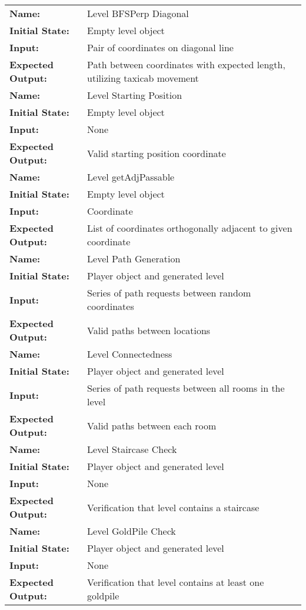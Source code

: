 \documentclass[12pt, titlepage]{article}
\begin{document}
\begin{center}
\begin{longtable}{ l | l }
\hline
\textbf{Name:} & Level BFSPerp Diagonal\\
\textbf{Initial State:} & Empty level object\\
\textbf{Input:} & Pair of coordinates on diagonal line\\
\textbf{Expected Output:} & Path between coordinates with expected length, utilizing taxicab movement\\
\hline
\textbf{Name:} & Level Starting Position\\
\textbf{Initial State:} & Empty level object\\
\textbf{Input:} & None\\
\textbf{Expected Output:} & Valid starting position coordinate\\
\hline
\textbf{Name:} & Level getAdjPassable\\
\textbf{Initial State:} & Empty level object\\
\textbf{Input:} & Coordinate\\
\textbf{Expected Output:} & List of coordinates orthogonally adjacent to given coordinate\\
\hline
\textbf{Name:} & Level Path Generation\\
\textbf{Initial State:} & Player object and generated level\\
\textbf{Input:} & Series of path requests between random coordinates\\
\textbf{Expected Output:} & Valid paths between locations\\
\hline
\textbf{Name:} & Level Connectedness\\
\textbf{Initial State:} & Player object and generated level\\
\textbf{Input:} & Series of path requests between all rooms in the level\\
\textbf{Expected Output:} & Valid paths between each room\\
\hline
\textbf{Name:} & Level Staircase Check\\
\textbf{Initial State:} & Player object and generated level\\
\textbf{Input:} & None\\
\textbf{Expected Output:} & Verification that level contains a staircase\\
\hline
\textbf{Name:} & Level GoldPile Check\\
\textbf{Initial State:} & Player object and generated level\\
\textbf{Input:} & None\\
\textbf{Expected Output:} & Verification that level contains at least one goldpile\\

\end{longtable}
\end{center}
\end{document}
